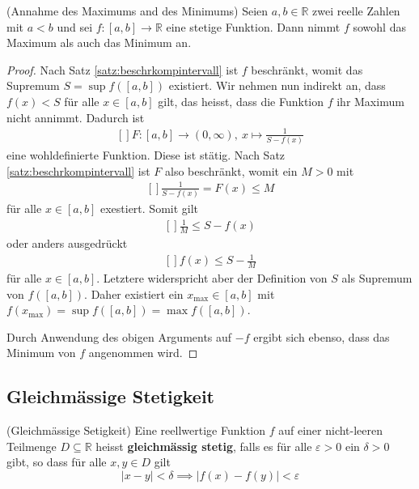 \documentclass[../Analysis1_script.tex]{subfiles}
\begin{document}
\begin{corollary}{(Annahme des Maximums and des Minimums)}
	Seien $a, b \in \mathbb {R}$ zwei reelle Zahlen mit $a<b$ und sei $f:[a,b] \to \mathbb {R}$ eine stetige Funktion. Dann nimmt $f$ sowohl das Maximum als auch das Minimum an. 
\end{corollary}

\begin{proof}
	Nach Satz \ref{satz:beschrkompintervall} ist $f$ beschränkt, womit das Supremum $S = \sup f([a,b])$ existiert. Wir nehmen nun indirekt an, dass $f(x)<S$ für alle $x \in [a,b]$ gilt, das heisst, dass die Funktion $f$ ihr Maximum nicht annimmt. Dadurch ist 
	\[\begin{aligned}[]
		F:[a,b] \to (0,\infty ),\ x \mapsto \frac {1}{S-f(x)}
	\end{aligned}\]
	eine wohldefinierte Funktion. Diese ist stätig. Nach Satz \ref{satz:beschrkompintervall} ist $F$ also beschränkt, womit ein $M > 0$ mit 
	\[\begin{aligned}[]
		\frac {1}{S-f(x)} = F(x) \leq M
	\end{aligned}\]
	für alle $x \in [a, b]$ exestiert. Somit gilt 
	\[\begin{aligned}[]
		\frac {1}{M} \leq S-f(x)
	\end{aligned}\]
	oder anders ausgedrückt
	\[\begin{aligned}[]
		f(x) \leq S- \frac {1}{M}
	\end{aligned}\]
	für alle $x \in[a, b]$. Letztere widerspricht aber der Definition von $S$ als Supremum von $f([a, b])$. Daher existiert ein $x_{\max } \in [a,b]$ mit $f(x_{\max }) = \sup f([a,b]) = \max f([a,b])$.
	
	Durch Anwendung des obigen Arguments auf $-f$ ergibt sich ebenso, dass das Minimum von $f$ angenommen wird.     
\end{proof}


\subsection{Gleichmässige Stetigkeit}

\begin{definition}{(Gleichmässige Setigkeit)}
	Eine reellwertige Funktion $f$ auf einer nicht-leeren Teilmenge $D \subseteq \mathbb{R}$ heisst \textbf{gleichmässig stetig}, falls es für alle $\varepsilon > 0$ ein $\delta > 0$ gibt, so dass für alle $x, y \in D$ gilt
	\[|x - y| < \delta \implies |f(x) - f(y)| < \varepsilon\]
\end{definition}
\end{document}
